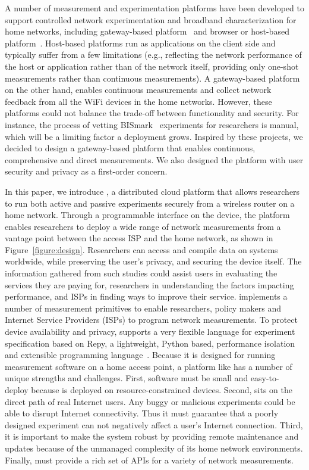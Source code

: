 A number of measurement and experimentation platforms have been developed to 
support controlled network experimentation and broadband characterization 
for home networks, including gateway-based platform~\cite{bajpai2014lessons,
samknows,183951,yiakoumis2014behop} and browser or host-based platform~\cite{
dhawan2012fathom,kreibich2010netalyzr,sanchez2014measurement}. Host-based 
platforms run as applications on the client side and typically suffer from a 
few limitations (e.g., reflecting the network performance of the host or 
application rather than of the network itself, providing only one-shot 
measurements rather than continuous measurements). A gateway-based platform 
on the other hand, enables continuous measurements and collect network 
feedback from all the WiFi devices in the home networks. However, these 
platforms could not balance the trade-off between functionality and security.
 For instance, the process of vetting BISmark~\cite{183951} experiments for 
researchers is manual, which will be a limiting factor a deployment grows. 
Inspired by these projects, we decided to design a gateway-based platform 
that enables continuous, comprehensive and direct measurements. We also 
designed the platform with user security and privacy as a first-order concern.
 
In this paper, we introduce \sysname, a distributed cloud platform that 
allows researchers to run both active and passive experiments securely from 
a wireless router on a home network. Through a programmable interface on the 
device, the platform enables researchers to deploy a wide range of network 
measurements from a vantage point between the access ISP and the home 
network, as shown in Figure~\ref{figure:design}. Researchers can access and 
compile data on systems worldwide, while preserving the user's privacy, and 
securing the device itself. The information gathered from such studies could 
assist users in evaluating the services they are paying for, researchers in 
understanding the factors impacting performance, and ISPs in finding ways to 
improve their service. \sysname implements a number of measurement 
primitives to enable researchers, policy makers and Internet Service 
Providers (ISPs) to program network measurements. To protect device 
availability and privacy, \sysname supports a very flexible language for 
experiment specification based on Repy, a lightweight, Python based, 
performance isolation and extensible programming language~\cite{
cappos2010retaining}. Because it is designed for running measurement 
software on a home access point, a platform like \sysname has a number of 
unique strengths and challenges. First, software must be small and easy-to-
deploy because \sysname is deployed on resource-constrained devices. Second, 
\sysname sits on the direct path of real Internet users. Any buggy or 
malicious experiments could be able to disrupt Internet connectivity. Thus 
it must guarantee that a poorly designed experiment can not negatively 
affect a user's Internet connection. Third, it is important to make the 
system robust by providing remote maintenance and updates because of the 
unmanaged complexity of its home network environments. Finally, \sysname 
must provide a rich set of APIs for a variety of network measurements. 

